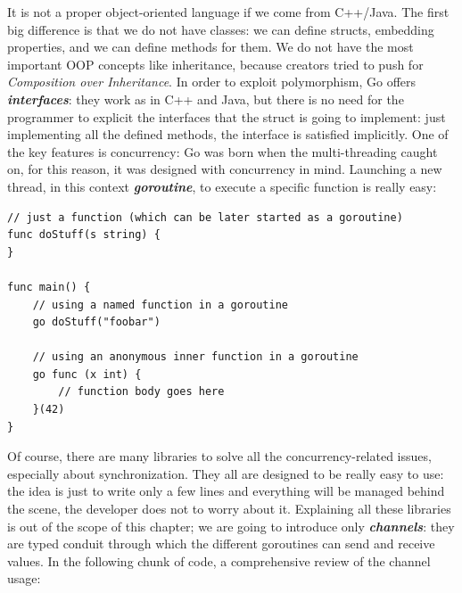 \documentclass[12pt,twoside,cucitura]{toptesi}
\begin{document}
It is not a proper object-oriented language if we come from C++/Java. The first big difference is that we do not have classes: we can define structs, embedding properties, and we can define methods for them. We do not have the most important OOP concepts like inheritance, because creators tried to push for \textit{Composition over Inheritance}\cite{composition_inheritance}. In order to exploit polymorphism, Go offers \textbf{\textit{interfaces}}: they work as in C++ and Java, but there is no need for the programmer to explicit the interfaces that the struct is going to implement: just implementing all the defined methods, the interface is satisfied implicitly.
One of the key features is concurrency: Go was born when the multi-threading caught on, for this reason, it was designed with concurrency in mind. Launching a new thread, in this context \textbf{\textit{goroutine}}, to execute a specific function is really easy:
\begin{lstlisting}
// just a function (which can be later started as a goroutine)
func doStuff(s string) {
}

func main() {
    // using a named function in a goroutine
    go doStuff("foobar")

    // using an anonymous inner function in a goroutine
    go func (x int) {
        // function body goes here
    }(42)
}
\end{lstlisting}
Of course, there are many libraries to solve all the concurrency-related issues, especially about synchronization. They all are designed to be really easy to use: the idea is just to write only a few lines and everything will be managed behind the scene, the developer does not to worry about it. Explaining all these libraries is out of the scope of this chapter; we are going to introduce only \textbf{\textit{channels}}: they are typed conduit through which the different goroutines can send and receive values. In the following chunk of code, a comprehensive review of the channel usage:
\end{document}
